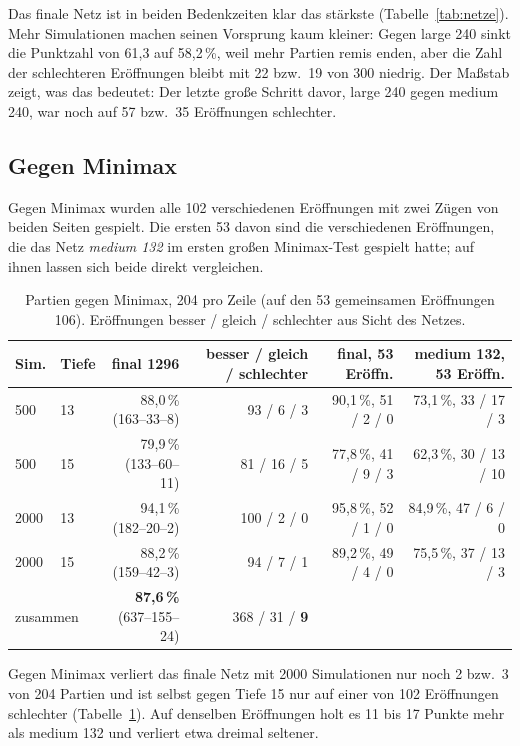 \documentclass[11pt,a4paper]{article}
\begin{document}
Das finale Netz ist in beiden Bedenkzeiten klar das stärkste (Tabelle~\ref{tab:netze}). Mehr Simulationen
machen seinen Vorsprung kaum kleiner: Gegen large 240 sinkt die Punktzahl von 61{,}3 auf 58{,}2\,\%, weil
mehr Partien remis enden, aber die Zahl der schlechteren Eröffnungen bleibt mit 22 bzw.\ 19 von 300
niedrig. Der Maßstab zeigt, was das bedeutet: Der letzte große Schritt davor, large 240 gegen medium 240,
war noch auf 57 bzw.\ 35 Eröffnungen schlechter.

\subsection{Gegen Minimax}

Gegen Minimax wurden alle 102 verschiedenen Eröffnungen mit zwei Zügen von beiden Seiten gespielt. Die
ersten 53 davon sind die verschiedenen Eröffnungen, die das Netz \emph{medium 132} im ersten großen
Minimax-Test gespielt hatte; auf ihnen lassen sich beide direkt vergleichen.

\begin{table}[ht]
\centering
\footnotesize
\setlength{\tabcolsep}{4pt}
\begin{tabular}{llrrrr}
\toprule
Sim. & Tiefe & final 1296 & besser / gleich / schlechter & final, 53 Eröffn. & medium 132, 53 Eröffn. \\
\midrule
500  & 13 & 88{,}0\,\% (163--33--8)  & 93 / 6 / 3   & 90{,}1\,\%, 51 / 2 / 0 & 73{,}1\,\%, 33 / 17 / 3 \\
500  & 15 & 79{,}9\,\% (133--60--11) & 81 / 16 / 5  & 77{,}8\,\%, 41 / 9 / 3 & 62{,}3\,\%, 30 / 13 / 10 \\
2000 & 13 & 94{,}1\,\% (182--20--2)  & 100 / 2 / 0  & 95{,}8\,\%, 52 / 1 / 0 & 84{,}9\,\%, 47 / 6 / 0 \\
2000 & 15 & 88{,}2\,\% (159--42--3)  & 94 / 7 / 1   & 89{,}2\,\%, 49 / 4 / 0 & 75{,}5\,\%, 37 / 13 / 3 \\
\midrule
\multicolumn{2}{l}{zusammen} & \textbf{87{,}6\,\%} (637--155--24) & 368 / 31 / \textbf{9} & & \\
\bottomrule
\end{tabular}
\caption{Partien gegen Minimax, 204 pro Zeile (auf den 53 gemeinsamen Eröffnungen 106). Eröffnungen besser / gleich / schlechter aus Sicht des Netzes.}
\label{tab:minimax}
\end{table}

Gegen Minimax verliert das finale Netz mit 2000 Simulationen nur noch 2 bzw.\ 3 von 204 Partien und ist
selbst gegen Tiefe 15 nur auf einer von 102 Eröffnungen schlechter (Tabelle~\ref{tab:minimax}). Auf
denselben Eröffnungen holt es 11 bis 17 Punkte mehr als medium 132 und verliert etwa dreimal seltener.
\end{document}
